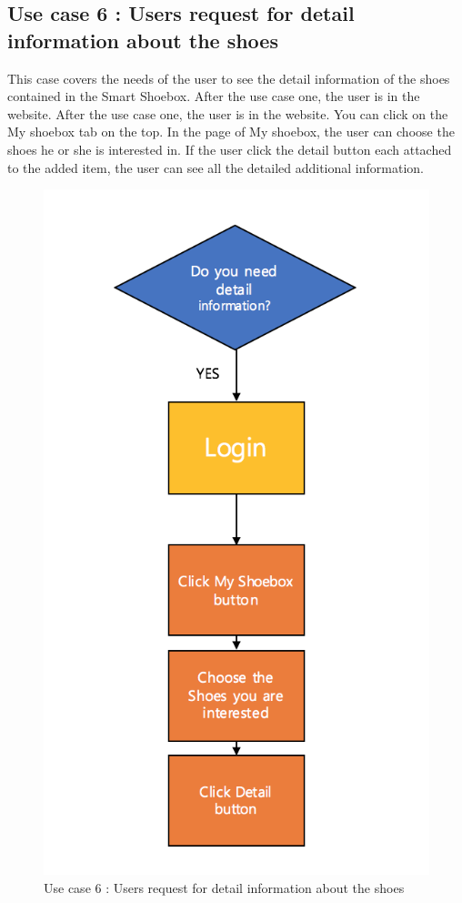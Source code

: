 \documentclass[conference]{IEEEtran}
\begin{document}
\subsection{Use case 6 : Users request for detail information about the shoes} This case covers the needs of the user to see the detail information of the shoes contained in the Smart Shoebox. After the use case one, the user is in the website.  After the use case one, the user is in the website. You can click on the My shoebox tab on the top. In the page of My shoebox, the user can choose the shoes he or she is interested in. If the user click the detail button each attached to the added item, the user can see all the detailed additional information.
\begin{figure}[H]
\begin{center}
    \includegraphics[scale=0.8]{usecase5}
    \caption{Use case 6 : Users request for detail information about the shoes} \label{fig:label}
\end{center}
\end{figure}
\end{document}
